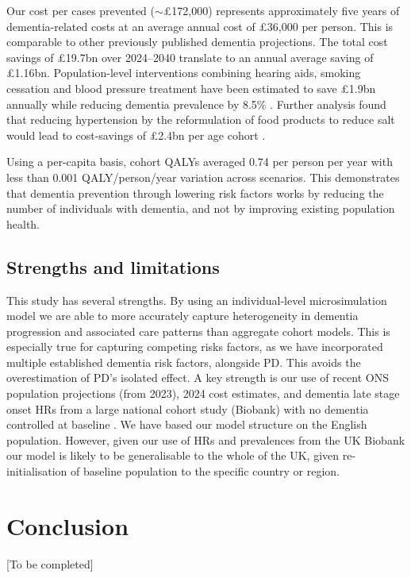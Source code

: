 \documentclass[11pt,a4paper]{article}
\begin{document}
Our cost per cases prevented ($\sim$\pounds172,000) represents approximately five years of dementia-related costs at an average annual cost of \pounds36,000 per person. This is comparable to other previously published dementia projections. The total cost savings of \pounds19.7bn over 2024--2040 translate to an annual average saving of \pounds1.16bn. Population-level interventions combining hearing aids, smoking cessation and blood pressure treatment have been estimated to save \pounds1.9bn annually while reducing dementia prevalence by 8.5\% \cite{ref46}. Further analysis found that reducing hypertension by the reformulation of food products to reduce salt would lead to cost-savings of \pounds2.4bn per age cohort \cite{ref37}.

Using a per-capita basis, cohort QALYs averaged 0.74 per person per year with less than 0.001 QALY/person/year variation across scenarios. This demonstrates that dementia prevention through lowering risk factors works by reducing the number of individuals with dementia, and not by improving existing population health.

\subsection{Strengths and limitations}

This study has several strengths. By using an individual-level microsimulation model we are able to more accurately capture heterogeneity in dementia progression and associated care patterns than aggregate cohort models. This is especially true for capturing competing risks factors, as we have incorporated multiple established dementia risk factors, alongside PD. This avoids the overestimation of PD's isolated effect. A key strength is our use of recent ONS population projections (from 2023), 2024 cost estimates, and dementia late stage onset HRs from a large national cohort study (Biobank) with no dementia controlled at baseline \cite{ref32}. We have based our model structure on the English population. However, given our use of HRs and prevalences from the UK Biobank our model is likely to be generalisable to the whole of the UK, given re-initialisation of baseline population to the specific country or region.

\section{Conclusion}

[To be completed]
\end{document}
